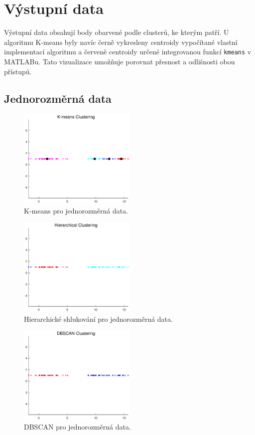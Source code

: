 \section{Výstupní data}
Výstupní data obsahují body obarvené podle clusterů, ke kterým patří. U algoritmu K-means byly navíc černě vykresleny centroidy vypočítané vlastní implementací algoritmu a červeně centroidy určené integrovanou funkcí \texttt{kmeans} v MATLABu. Tato vizualizace umožňuje porovnat přesnost a odlišnosti obou přístupů.

\subsection{Jednorozměrná data}

\begin{figure}[H]
    \centering
    \includegraphics[width=0.5\textwidth]{images/1D_kmeans_2.eps}
    \caption{K-means pro jednorozměrná data.}
\end{figure}

\begin{figure}[H]
    \centering
    \includegraphics[width=0.5\textwidth]{images/1D_hierar_2.eps}
    \caption{Hierarchické shlukování pro jednorozměrná data.}
\end{figure}

\begin{figure}[H]
    \centering
    \includegraphics[width=0.5\textwidth]{images/1D_DBSCAN_2.eps}
    \caption{DBSCAN pro jednorozměrná data.}
\end{figure}

